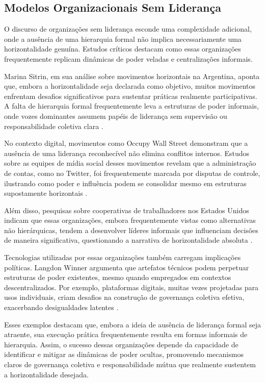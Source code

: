 \subsection{Modelos Organizacionais Sem Liderança}
\label{sec:modelos_sem_lideranca}

O discurso de organizações sem liderança esconde uma complexidade
adicional, onde a ausência de uma hierarquia formal não implica
necessariamente uma horizontalidade genuína. Estudos críticos destacam como
essas organizações frequentemente replicam dinâmicas de poder veladas e
centralizações informais.

Marina Sitrin, em sua análise sobre movimentos horizontais na Argentina,
aponta que, embora a horizontalidade seja declarada como objetivo, muitos
movimentos enfrentam desafios significativos para sustentar práticas
realmente participativas. A falta de hierarquia formal frequentemente leva
a estruturas de poder informais, onde vozes dominantes assumem papéis de
liderança sem supervisão ou responsabilidade coletiva clara
\cite{EverydayRevolutions}.

No contexto digital, movimentos como Occupy Wall Street demonstram que a
ausência de uma liderança reconhecível não elimina conflitos internos.
Estudos sobre as equipes de mídia social desses movimentos revelam que a
administração de contas, como no Twitter, foi frequentemente marcada por
disputas de controle, ilustrando como poder e influência podem se
consolidar mesmo em estruturas supostamente horizontais
\cite{SocialMediaTeamsAsDigitalVanguards}.

Além disso, pesquisas sobre cooperativas de trabalhadores nos Estados
Unidos indicam que essas organizações, embora frequentemente vistas como
alternativas não hierárquicas, tendem a desenvolver líderes informais que
influenciam decisões de maneira significativa, questionando a narrativa de
horizontalidade absoluta \cite{WorkerCooperativesandRevolution}.

Tecnologias utilizadas por essas organizações também carregam implicações
políticas. Langdon Winner argumenta que artefatos técnicos podem perpetuar
estruturas de poder existentes, mesmo quando empregados em contextos
descentralizados. Por exemplo, plataformas digitais, muitas vezes
projetadas para usos individuais, criam desafios na construção de
governança coletiva efetiva, exacerbando desigualdades latentes
\cite{DoArtifactsHavePolitics}.

Esses exemplos destacam que, embora a ideia de ausência de liderança formal
seja atraente, sua execução prática frequentemente resulta em formas
informais de hierarquia. Assim, o sucesso dessas organizações depende da
capacidade de identificar e mitigar as dinâmicas de poder ocultas,
promovendo mecanismos claros de governança coletiva e responsabilidade
mútua que realmente sustentem a horizontalidade desejada.

